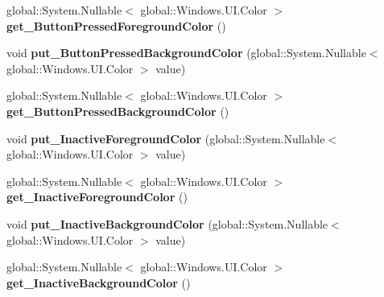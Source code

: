 \begin{DoxyCompactItemize}
global\+::\+System.\+Nullable$<$ global\+::\+Windows.\+U\+I.\+Color $>$ {\bfseries get\+\_\+\+Button\+Pressed\+Foreground\+Color} ()
\item 
\mbox{\label{class_windows_1_1_u_i_1_1_view_management_1_1_application_view_title_bar_ac6b52566c45f42efc81c9a0e973afa85}} 
void {\bfseries put\+\_\+\+Button\+Pressed\+Background\+Color} (global\+::\+System.\+Nullable$<$ global\+::\+Windows.\+U\+I.\+Color $>$ value)
\item 
\mbox{\label{class_windows_1_1_u_i_1_1_view_management_1_1_application_view_title_bar_af882393a152b9df371e3781f739cabac}} 
global\+::\+System.\+Nullable$<$ global\+::\+Windows.\+U\+I.\+Color $>$ {\bfseries get\+\_\+\+Button\+Pressed\+Background\+Color} ()
\item 
\mbox{\label{class_windows_1_1_u_i_1_1_view_management_1_1_application_view_title_bar_ab42ad105c4bc400b515275e8802c38ad}} 
void {\bfseries put\+\_\+\+Inactive\+Foreground\+Color} (global\+::\+System.\+Nullable$<$ global\+::\+Windows.\+U\+I.\+Color $>$ value)
\item 
\mbox{\label{class_windows_1_1_u_i_1_1_view_management_1_1_application_view_title_bar_a5258d150c16f577f11ca52e8b41ba734}} 
global\+::\+System.\+Nullable$<$ global\+::\+Windows.\+U\+I.\+Color $>$ {\bfseries get\+\_\+\+Inactive\+Foreground\+Color} ()
\item 
\mbox{\label{class_windows_1_1_u_i_1_1_view_management_1_1_application_view_title_bar_aa912163f22981533bcaf244d367a36e0}} 
void {\bfseries put\+\_\+\+Inactive\+Background\+Color} (global\+::\+System.\+Nullable$<$ global\+::\+Windows.\+U\+I.\+Color $>$ value)
\item 
\mbox{\label{class_windows_1_1_u_i_1_1_view_management_1_1_application_view_title_bar_aab1e5ef6e2bc37796640ab4cd4c4d182}} 
global\+::\+System.\+Nullable$<$ global\+::\+Windows.\+U\+I.\+Color $>$ {\bfseries get\+\_\+\+Inactive\+Background\+Color} ()

\end{DoxyCompactItemize}
